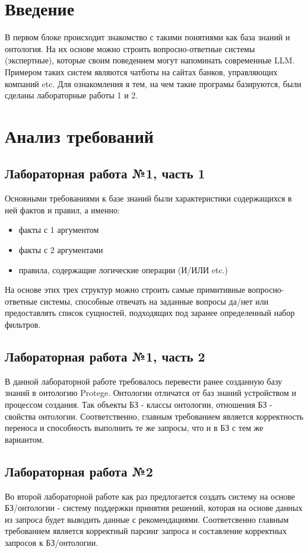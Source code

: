 \documentclass{article}
\begin{document}
\section{Введение}
В первом блоке происходит знакомство с такими понятиями как база знаний и онтология. На их основе можно строить вопросно-ответные системы (экспертные), которые своим поведением могут напоминать современные LLM. Примером таких систем являются чатботы на сайтах банков, управляющих компаний etc. Для ознакомления я тем, на чем такие програмы базируются, были сделаны лабораторные работы 1 и 2.
\section{Анализ требований}
\subsection{Лабораторная работа №1, часть 1}
Основными требованиями к базе знаний были характеристики содержащихся в ней фактов и правил, а именно:
\begin{itemize}
\item факты с 1 аргументом
\item факты с 2 аргументами
\item правила, содержащие логические операции (И/ИЛИ etc.)
\end{itemize}
На основе этих трех структур можно строить самые примитивные вопросно-ответные системы, способные отвечать на заданные вопросы да/нет или предоставлять список сущностей, подходящих под заранее определенный набор фильтров.
\subsection{Лабораторная работа №1, часть 2}
В данной лабораторной работе требовалось перевести ранее созданную базу знаний в онтологию Protege. Онтологии отличатся от баз знаний устройством и процессом создания. Так объекты БЗ - классы онтологии, отношения БЗ - свойства онтологии. Соответственно, главным требованием является корректность переноса и способность выполнить те же запросы, что и в БЗ с тем же вариантом.
\subsection{Лабораторная работа №2}
Во второй лабораторной работе как раз предлогается создать систему на основе БЗ/онтологии - систему поддержки принятия решений, которая на основе данных из запроса будет выводить данные с рекомендациями. Соответсвенно главным требованием является корректный парсинг запроса и составление корректных запросов к БЗ/онтологии. 
\end{document}
